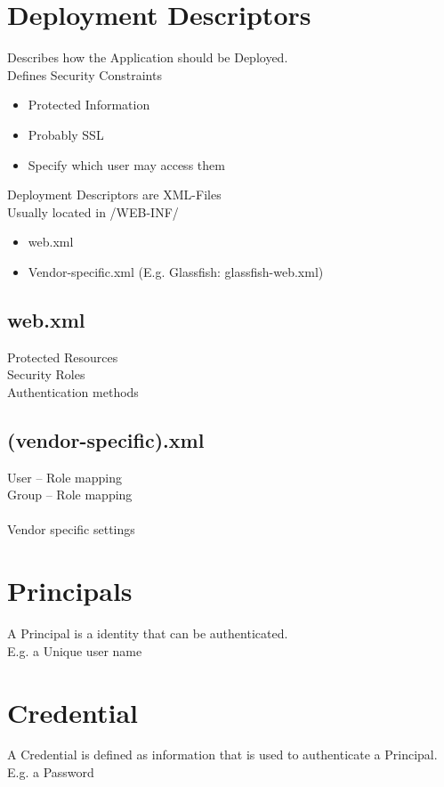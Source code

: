 \documentclass[12pt,a4paper,draft]{report}
\begin{document}
\section{Deployment Descriptors}
Describes how the Application should be Deployed.\\
Defines Security Constraints\\
\begin{itemize}
	\item Protected Information
	\item Probably SSL
	\item Specify which user may access them
\end{itemize}
Deployment Descriptors are XML-Files\\
Usually located in /WEB-INF/\\
\begin{itemize}
	\item web.xml
	\item Vendor-specific.xml (E.g. Glassfish: glassfish-web.xml)
\end{itemize}

\subsection*{web.xml}
Protected Resources\\
Security Roles\\
Authentication methods\\

\subsection*{(vendor-specific).xml}
User – Role mapping\\
Group – Role mapping\\
\\
Vendor specific settings\\

\section{Principals}
A Principal is a identity that can be authenticated.\\
E.g. a Unique user name\\

\section{Credential}
A Credential is defined as information that is used to authenticate a Principal.\\
E.g. a Password\\
\end{document}
